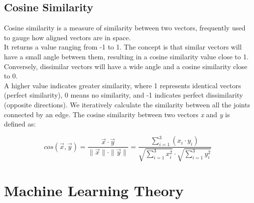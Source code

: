 \subsection{Cosine Similarity}
\label{subsec:cosine_sim}
Cosine similarity is a measure of similarity between two vectors, frequently used to gauge how aligned vectors are in space. \\ 
It returns a value ranging from -1 to 1. 
The concept is that similar vectors will have a small angle between them, resulting in a cosine similarity value close to 1. \\ 
Conversely, dissimilar vectors will have a wide angle and a cosine similarity close to 0.\\ 
A higher value indicates greater similarity, where 1 represents identical vectors (perfect similarity), 0 means no similarity, and -1 indicates perfect dissimilarity (opposite directions). 
We iteratively calculate the similarity between all the joints connected by an edge. 
The cosine similarity between two vectors \textit{x} and \textit{y} is defined as: 

\begin{equation}  
  cos(\vec{x}, \vec{y}) = \frac{\vec{x} \cdot \vec{y}}{\|\vec{x}\| \cdot \|\vec{y}\|}  =  \frac{\sum_{i=1}^{3} (x_i \cdot y_i)}{\sqrt{\sum_{i=1}^{3} x_i^2} \cdot \sqrt{\sum_{i=1}^{3} y_i^2}}    
\end{equation} 



\section{Machine Learning Theory}
\label{subsec:ML}

